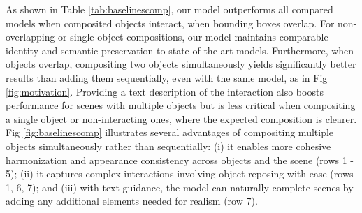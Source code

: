 As shown in Table \ref{tab:baselinescomp}, our model outperforms all compared models when composited objects interact, \ie when bounding boxes overlap. For non-overlapping or single-object compositions, our model maintains comparable identity and semantic preservation to state-of-the-art models. Furthermore, when objects overlap, compositing two objects simultaneously yields significantly better results than adding them sequentially, even with the same model, as in Fig \ref{fig:motivation}. Providing a text description of the interaction also boosts performance for scenes with multiple objects but is less critical when compositing a single object or non-interacting ones, where the expected composition is clearer.
Fig \ref{fig:baselinescomp} illustrates several advantages of compositing multiple objects simultaneously rather than sequentially: (i) it enables more cohesive harmonization and appearance consistency across objects and the scene (rows 1 - 5); (ii) it captures complex interactions involving object reposing with ease (rows 1, 6, 7); and (iii) with text guidance, the model can naturally complete scenes by adding any additional elements needed for realism (row 7).



